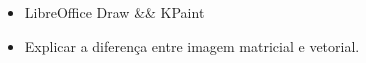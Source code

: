 \begin{itemize}
	\item LibreOffice Draw \&\& KPaint
	\item Explicar a diferença entre imagem matricial e vetorial.
\end{itemize}